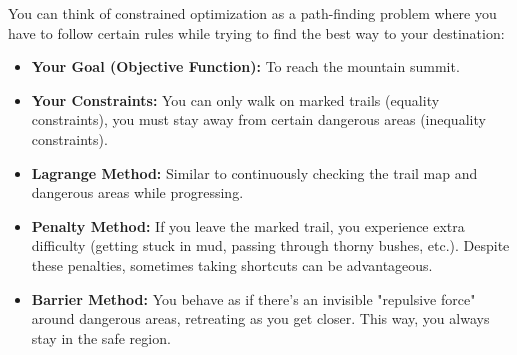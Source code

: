 \begin{tcolorbox}[title=Constrained Optimization Analogy: Path Finding]
You can think of constrained optimization as a path-finding problem where you have to follow certain rules while trying to find the best way to your destination:

\begin{itemize}
    \item \textbf{Your Goal (Objective Function):} To reach the mountain summit.
    \item \textbf{Your Constraints:} You can only walk on marked trails (equality constraints), you must stay away from certain dangerous areas (inequality constraints).
    
    \item \textbf{Lagrange Method:} Similar to continuously checking the trail map and dangerous areas while progressing.
    
    \item \textbf{Penalty Method:} If you leave the marked trail, you experience extra difficulty (getting stuck in mud, passing through thorny bushes, etc.). Despite these penalties, sometimes taking shortcuts can be advantageous.
    
    \item \textbf{Barrier Method:} You behave as if there's an invisible "repulsive force" around dangerous areas, retreating as you get closer. This way, you always stay in the safe region.
\end{itemize}
\end{tcolorbox}

